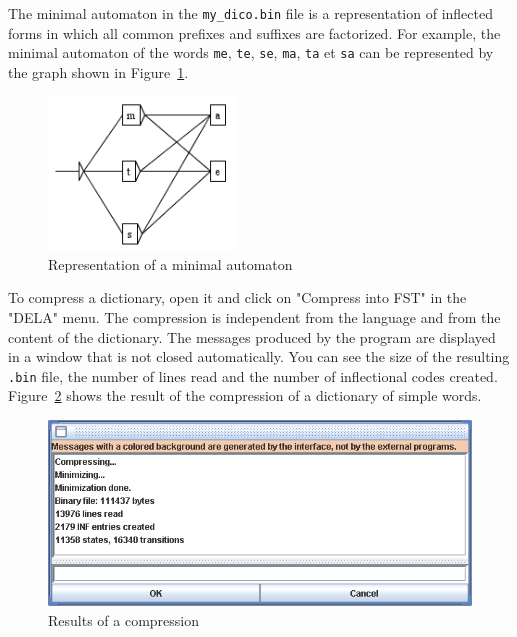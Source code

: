 \noindent The minimal automaton in the \verb+my_dico.bin+ file is a
representation of inflected forms in which all common prefixes and suffixes are factorized. For
example, the minimal automaton of the words \verb+me+, \verb+te+, \verb+se+,
\verb+ma+, \verb+ta+ et \verb+sa+ can be represented by the graph shown in
Figure~\ref{fig-example-minimal-automaton}. \bigskip \begin{figure}[!h]
\begin{center}
\includegraphics[width=5cm]{resources/img/fig3-8.png}
\caption{Representation of a minimal
automaton\label{fig-example-minimal-automaton}}
\end{center}
\end{figure}

\noindent To compress a dictionary, open it and click on "Compress into FST" in
the "DELA" menu. The compression is independent from the language and from the content of
the dictionary. The messages produced by the program are displayed in a window
that is not closed automatically. You can see the size of the resulting
\verb+.bin+ file, the number of lines read and the number of inflectional codes
created. Figure~\ref{fig-compression-result} shows the result of
the compression of a dictionary of simple words. \bigskip
\begin{figure}[!h]
\begin{center}
\includegraphics[width=14cm]{resources/img/fig3-9.png}
\caption{Results of a compression\label{fig-compression-result}}
\end{center}
\end{figure}

